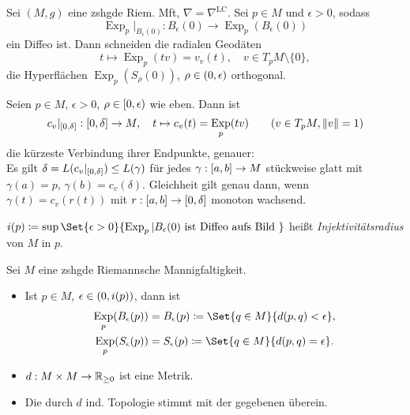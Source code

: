\documentclass{cheat-sheet}
\DeclareMathOperator{\Exp}{Exp} %
\newcommand{\abinterval}{\cinterval{a}{b}} %
\newcommand{\LC}{\nabla^{\mathrm{LC}}} %
\begin{document}
\begin{satz} %
  Sei $(M, g)$ eine zshgde Riem. Mft, $\nabla = \LC$. Sei $p \in M$ und $\epsilon > 0$, sodass
  \[ \Exp_p|_{B_{\epsilon}(0)} : B_{\epsilon}(0) \to \Exp_p(B_{\epsilon}(0)) \]
  ein Diffeo ist. Dann schneiden die radialen Geodäten
  \[ t \mapsto \Exp_p(tv) = v_v(t), \quad v \in T_p M \setminus \{ 0 \},  \]
  die Hyperflächen $\Exp_p(S_\rho(0))$, $\rho \in \left( 0, \epsilon \right)$ orthogonal.
\end{satz}

\begin{satz}
  Seien $p \in M$, $\epsilon > 0$, $\rho \in \left[ 0, \epsilon \right)$ wie eben. Dann ist
  \[
    c_v|_{\cinterval{0}{\delta}} : \cinterval{0}{\delta} \to M, \quad
    t \mapsto c_v(t) = \Exp_p(t v) \qquad
    (v \in T_p M, \norm{v} = 1)
  \]
  die kürzeste Verbindung ihrer Endpunkte, genauer: \\
  Es gilt $\delta = L(c_v|_{\left[ 0, \delta \right]}) \leq L(\gamma)$ für jedes $\gamma : \abinterval \to M$ stückweise glatt mit $\gamma(a) = p$, $\gamma(b) = c_v(\delta)$.
  Gleichheit gilt genau dann, wenn $\gamma(t) = c_v(r(t))$ mit $r : \abinterval \to \cinterval{0}{\delta}$ monoton wachsend.
\end{satz}


\begin{defn}
  $i(p) \coloneqq \sup \Set{ \epsilon > 0 }{ \Exp_p|B_{\epsilon}(0) \text{ ist Diffeo aufs Bild } }$
  heißt \emph{Injektivitätsradius} von $M$ in $p$.
\end{defn}

\begin{satz}
  Sei $M$ eine zshgde Riemannsche Mannigfaltigkeit.
  \begin{itemize}
    \item Ist $p \in M$, $\epsilon \in \left( 0, i(p) \right)$, dann ist
    \begin{align*}
      \Exp_p(B_\epsilon(p)) & = B_\epsilon(p) \coloneqq \Set{q \in M}{d(p, q) < \epsilon},\\
      \Exp_p(S_\epsilon(p)) & = S_\epsilon(p) \coloneqq \Set{q \in M}{d(p, q) = \epsilon}.
    \end{align*}
    \item $d : M \times M \to \mathbb{R}_{\geq 0}$ ist eine Metrik.
    \item Die durch $d$ ind. Topologie stimmt mit der gegebenen überein.
  \end{itemize}
\end{satz}
\end{document}
